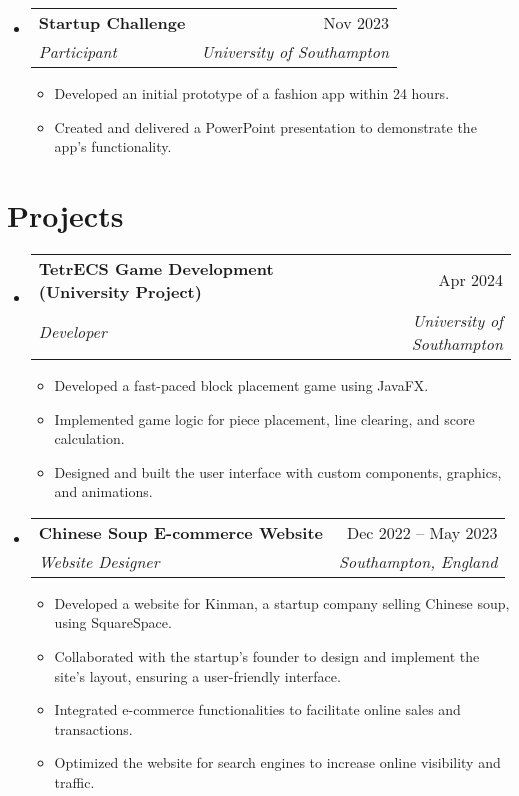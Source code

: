\documentclass[letterpaper,10pt]{article}
\makeatletter
\newcommand{\resumeItem}[1]{
  \item\small{
    {#1 \vspace{-2pt}}
  }
}
\newcommand{\resumeSubheading}[4]{
  \vspace{-2pt}\item
    \begin{tabular*}{0.97\textwidth}[t]{l@{\extracolsep{\fill}}r}
      \textbf{#1} & #2 \\
      \textit{\small#3} & \textit{\small #4} \\
    \end{tabular*}\vspace{-7pt}
}
\newcommand{\resumeSubHeadingListStart}{\begin{itemize}[leftmargin=0.15in, label={}]}
\newcommand{\resumeSubHeadingListEnd}{\end{itemize}}
\newcommand{\resumeItemListStart}{\begin{itemize}}
\newcommand{\resumeItemListEnd}{\end{itemize}\vspace{-5pt}}
\makeatother
\begin{document}
\resumeSubHeadingListStart
    \resumeSubheading
      {Startup Challenge}{Nov 2023}
      {Participant}{University of Southampton}
      \resumeItemListStart
        \resumeItem{Developed an initial prototype of a fashion app within 24 hours.}
        \resumeItem{Created and delivered a PowerPoint presentation to demonstrate the app's functionality.}
      \resumeItemListEnd
\resumeSubHeadingListEnd 

\vspace{10mm}

\section{Projects}
\resumeSubHeadingListStart
    \resumeSubheading
      {TetrECS Game Development (University Project)}{Apr 2024}
      {Developer}{University of Southampton}
      \resumeItemListStart
        \resumeItem{Developed a fast-paced block placement game using JavaFX.}
        \resumeItem{Implemented game logic for piece placement, line clearing, and score calculation.}
        \resumeItem{Designed and built the user interface with custom components, graphics, and animations.}
      \resumeItemListEnd
\resumeSubHeadingListEnd

\resumeSubHeadingListStart
    \resumeSubheading
      {Chinese Soup E-commerce Website}{Dec 2022 -- May 2023}
      {Website Designer}{Southampton, England}
      \resumeItemListStart
        \resumeItem{Developed a website for Kinman, a startup company selling Chinese soup, using SquareSpace.}
        \resumeItem{Collaborated with the startup's founder to design and implement the site's layout, ensuring a user-friendly interface.}
        \resumeItem{Integrated e-commerce functionalities to facilitate online sales and transactions.}
        \resumeItem{Optimized the website for search engines to increase online visibility and traffic.}
      \resumeItemListEnd
\resumeSubHeadingListEnd

\end{document}
